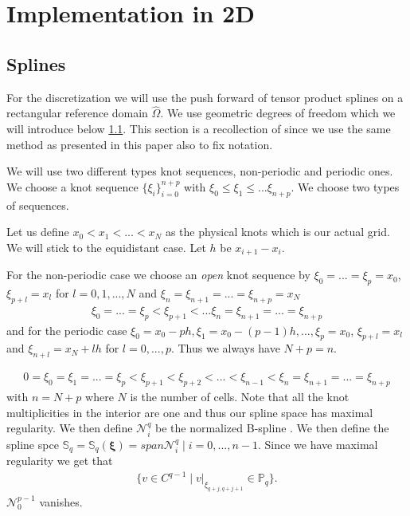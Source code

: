 \documentclass[../master_thesis.tex]{subfiles}
\begin{document}
\section{Implementation in 2D}

\subsection{Splines}

For the discretization we will use the push forward of tensor product splines 
on a rectangular reference domain $\hat{\Omega}$. We use geometric degrees of freedom
which we will introduce below \ref{}. This section is a recollection 
 of \cite[Sec. 4.2]{broken FEEC framework on mapped multipatch} 
since we use the same method as presented in this paper also to fix notation. 

We will use two different types knot sequences, non-periodic and periodic ones. 
We choose a knot sequence $\{ \xi_i \}_{i=0}^{n+p}$ with 
$\xi_0 \leq \xi_1 \leq ... \xi_{n+p}$. We choose two types of sequences.

Let us define $x_0 < x_1 < ... < x_N$ as the physical knots which 
is our actual grid. We will stick to the equidistant case. Let $h$ be 
$x_{i+1} - x_i$.

For the non-periodic case we choose an \textit{open} knot sequence by 
$\xi_0 = ... = \xi_p = x_0$, $\xi_{p+l} = x_l$ for $l = 0,1,...,N$ and 
$\xi_{n} = \xi_{n+1} = ... = \xi_{n+p} = x_N$
\begin{align*}
    \xi_0 = ... = \xi_p < \xi_{p+1} < ... \xi_{n} = \xi_{n+1} = ... = \xi_{n+p}    
\end{align*}
and for the periodic case 
$\xi_0 = x_0-ph, \xi_1 = x_0-(p-1)h, ..., \xi_p = x_0$,
$\xi_{p+l} = x_l$ and $\xi_{n+l} = x_N + lh$ for $l = 0, ..., p$. 
Thus we always have $N+p = n$. 

\begin{align*}
    0 =  \xi_0 = \xi_1 = ... = \xi_p < \xi_{p+1} < \xi_{p+2} < ... < \xi_{n-1} < \xi_n 
    = \xi_{n+1} = ... = \xi_{n+p}
\end{align*}
with $n = N + p$ where $N$ is the number of cells.
Note that all the knot multiplicities in the interior are one and thus our spline 
space has maximal regularity. We then define 
$\mathcal{N}_i^q$ be the normalized B-spline \cite[Ref. 46, Def.4.19]{multipatch paper}.
We then define the spline spce $\mathbb{S}_q = \mathbb{S}_q(\bm{\xi}) = 
span{\mathcal{N}_i^q \mid i = 0, ..., n-1}$. Since we have maximal regularity 
we get that 
\begin{align*}
    \{ v \in C^{q-1} \mid v |_{\xi_{q+j, q+j+1}} \in \mathbb{P}_q \}.
\end{align*}
$\mathcal{N}_0^{p-1} $ vanishes.
\end{document}
